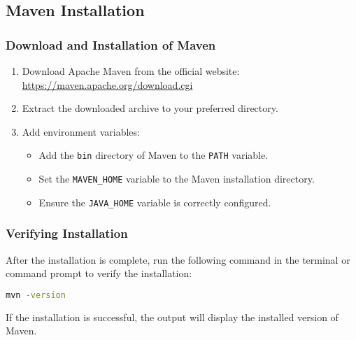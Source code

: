 \documentclass[aspectratio=169, table]{beamer}
\begin{document}
\subsection{Maven Installation}
\begin{frame}
	\frametitle{Download and Installation of Maven}
	\begin{enumerate}
		\item Download Apache Maven from the official website: \url{https://maven.apache.org/download.cgi}
		\item Extract the downloaded archive to your preferred directory.
		\item Add environment variables:
		\begin{itemize}
			\item Add the \texttt{bin} directory of Maven to the \texttt{PATH} variable.
			\item Set the \texttt{MAVEN\_HOME} variable to the Maven installation directory.
			\item Ensure the \texttt{JAVA\_HOME} variable is correctly configured.
		\end{itemize}
	\end{enumerate}
\end{frame}

\begin{frame}[fragile]
	\frametitle{Verifying Installation}
	After the installation is complete, run the following command in the terminal or command prompt to verify the installation:
	\begin{lstlisting}[language=bash]
		mvn -version
	\end{lstlisting}
	If the installation is successful, the output will display the installed version of Maven.
\end{frame}
\end{document}
